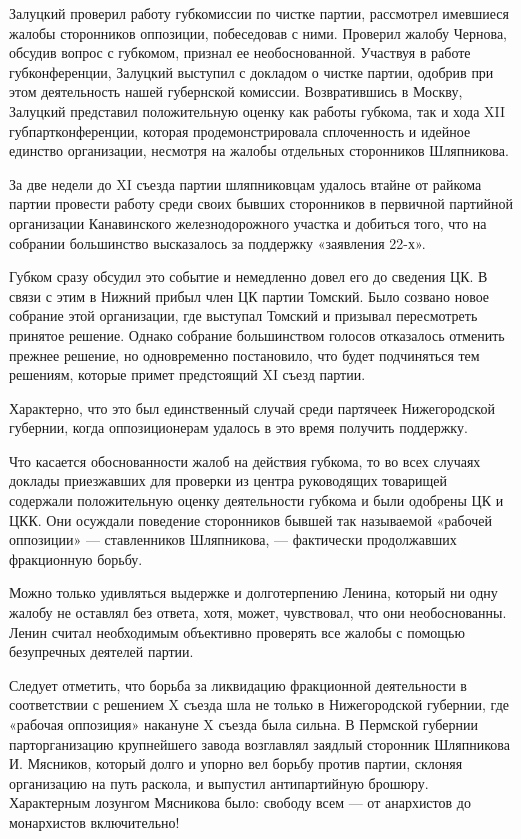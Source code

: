 \documentclass[12pt, a4paper, openany]{book}
\begin{document}
Залуцкий проверил работу губкомиссии по чистке партии, рассмотрел имевшиеся жалобы сторонников оппозиции, побеседовав с ними. Проверил жалобу Чернова, обсудив вопрос с губкомом, признал ее необоснованной. Участвуя в работе губконференции, Залуцкий выступил с докладом о чистке партии, одобрив при этом деятельность нашей губернской комиссии. Возвратившись в Москву, Залуцкий представил положительную оценку как работы губкома, так и хода XII губпартконференции, которая продемонстрировала сплоченность и идейное единство организации, несмотря на жалобы отдельных сторонников Шляпникова.

За две недели до XI съезда партии шляпниковцам удалось втайне от райкома партии провести работу среди своих бывших сторонников в первичной партийной организации Канавинского железнодорожного участка и добиться того, что на собрании большинство высказалось за поддержку «заявления 22-х».

Губком сразу обсудил это событие и немедленно довел его до сведения ЦК. В связи с этим в Нижний прибыл член ЦК партии Томский. Было созвано новое собрание этой организации, где выступал Томский и призывал пересмотреть принятое решение. Однако собрание большинством голосов отказалось отменить прежнее решение, но одновременно постановило, что будет подчиняться тем решениям, которые примет предстоящий XI съезд партии.

Характерно, что это был единственный случай среди партячеек Нижегородской губернии, когда оппозиционерам удалось в это время получить поддержку.

Что касается обоснованности жалоб на действия губкома, то во всех случаях доклады приезжавших для проверки из центра руководящих товарищей содержали положительную оценку деятельности губкома и были одобрены ЦК и ЦКК. Они осуждали поведение сторонников бывшей так называемой «рабочей оппозиции» — ставленников Шляпникова, — фактически продолжавших фракционную борьбу.

Можно только удивляться выдержке и долготерпению Ленина, который ни одну жалобу не оставлял без ответа, хотя, может, чувствовал, что они необоснованны. Ленин считал необходимым объективно проверять все жалобы с помощью безупречных деятелей партии.

Следует отметить, что борьба за ликвидацию фракционной деятельности в соответствии с решением X съезда шла не только в Нижегородской губернии, где «рабочая оппозиция» накануне X съезда была сильна. В Пермской губернии парторганизацию крупнейшего завода возглавлял заядлый сторонник Шляпникова И. Мясников, который долго и упорно вел борьбу против партии, склоняя организацию на путь раскола, и выпустил антипартийную брошюру. Характерным лозунгом Мясникова было: свободу всем — от анархистов до монархистов включительно!
\end{document}
